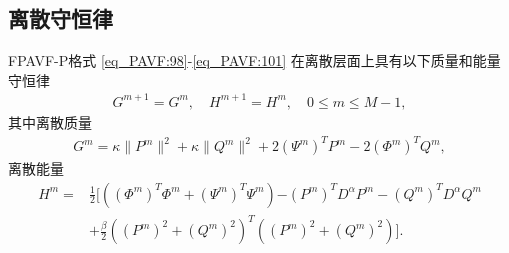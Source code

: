\subsection{离散守恒律}
\begin{theorem}\label{thm_PAVF:4}
FPAVF-P格式 \eqref{eq_PAVF:98}-\eqref{eq_PAVF:101} 在离散层面上具有以下质量和能量守恒律
\begin{align}\label{eq_PAVF:11141}
G^{m+1}=G^{m} , \quad H^{m+1}=H^{m} , \quad 0 \leq m \leq M-1 , 
\end{align}
其中离散质量
\begin{align}\label{eq_PAVF:11142}
G^{m}=\kappa\|P^{m}\|^2+\kappa\|Q^{m}\|^2+2 \left(\Psi^{m}\right)^T P^{m}-2 \left(\varPhi^{m}\right)^T Q^{m} , 
\end{align}
离散能量
\begin{align}
H^{m}=&\frac{1}{2}[((\varPhi^{m})^{T}\varPhi^{m}+(\Psi^{m})^{T}\Psi^{m}){-(P^{m})^{T} D^{\alpha} P^{m}-(Q^{m})^{T} D^{\alpha} Q^{m}}\nonumber\\
&+\frac{\beta}{2}((P^{m})^2+(Q^{m})^2)^{T}((P^{m})^2+(Q^{m})^2)] . \label{eq_PAVF:800}
\end{align}
\end{theorem}

